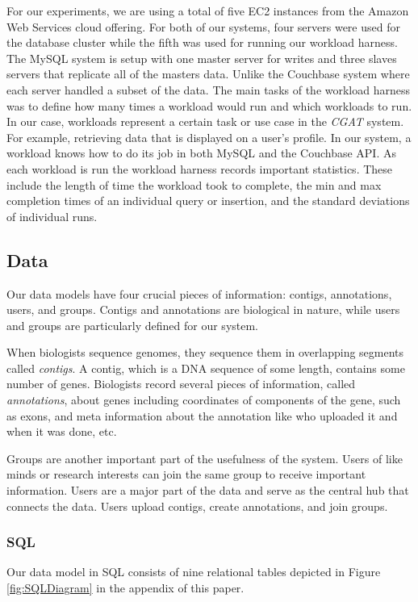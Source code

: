 \documentclass[10pt, conference, compsocconf]{IEEEtran}
\begin{document}
For our experiments, we are using a total of five EC2 instances from the Amazon
Web Services cloud offering. For both of our systems, four servers were used
for the database cluster while the fifth was used for running our workload
harness. The MySQL system is setup with one master server for writes and three
slaves servers that replicate all of the masters data. Unlike the Couchbase
system where each server handled a subset of the data.  The main tasks of the
workload harness was to define how many times a workload would run and which
workloads to run. In our case, workloads represent a certain task or use case
in the \textit{CGAT} system. For example, retrieving data that is displayed on
a user's profile. In our system, a workload knows how to do its job in both
MySQL and the Couchbase API.  As each workload is run the workload harness
records important statistics.  These include the length of time the workload
took to complete, the min and max completion times of an individual query or
insertion, and the standard deviations of individual runs.

\subsection{Data}
Our data models have four crucial pieces of information: contigs, annotations,
users, and groups. Contigs and annotations are biological in nature, while
users and groups are particularly defined for our system.

When biologists sequence genomes, they sequence them in overlapping segments
called \textit{contigs}. A contig, which is a DNA sequence of some length, contains some
number of genes. Biologists record several pieces of information, called
\textit{annotations}, about genes including coordinates of components of the gene, such
as exons, and meta information about the annotation like who uploaded it and
when it was done, etc.

Groups are another important part of the usefulness of the system. Users of
like minds or research interests can join the same group to receive important
information. Users are a major part of the data and serve as the central hub that connects the
data. Users upload contigs, create annotations, and join groups.

\subsubsection{SQL}
Our data model in SQL consists of nine relational tables depicted in Figure
\ref{fig:SQLDiagram} in the appendix of this paper.
\end{document}
